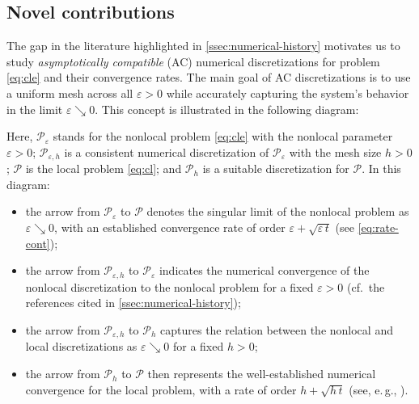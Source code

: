 \documentclass[10pt]{amsart}
\theoremstyle{plain}
\theoremstyle{definition}
\numberwithin{equation}{section}
\newcommand{\eps}{{\varepsilon}}
\begin{document}
\subsection{Novel contributions}
\label{ssec:novelty}

The gap in the literature highlighted in \cref{ssec:numerical-history} motivates us to study \emph{asymptotically compatible} (AC) numerical discretizations for problem \cref{eq:cle} and their convergence rates. The main goal of AC discretizations is to use a uniform mesh across all $\eps>0$ while accurately capturing the system's behavior in the limit $\eps \searrow 0$. This concept is illustrated in the following diagram:
\begin{center}
\end{center}
Here, $\mathcal{P}_{\eps}$ stands for the nonlocal problem \cref{eq:cle} with the nonlocal parameter $\eps >0$; $\mathcal{P}_{\eps,h}$ is a consistent numerical discretization of $\mathcal{P}_{\eps}$ with the mesh size $h>0$; $\mathcal P$ is the local problem \cref{eq:cl}; and $\mathcal P_h$ is a suitable discretization for $\mathcal P$. In this diagram:
\begin{itemize}
    \item the arrow from $\mathcal{P}_{\eps}$ to $\mathcal{P}$ denotes the singular limit of the nonlocal problem as $\eps \searrow 0$, with an established convergence rate of order $\eps + \sqrt{\eps\, t}$ (see \cref{eq:rate-cont});
    \item the arrow from $\mathcal{P}_{\eps,h}$ to $\mathcal{P}_\eps$ indicates the numerical convergence of the nonlocal discretization to the nonlocal problem for a fixed $\eps>0$ (cf.~the references cited in \cref{ssec:numerical-history});
    \item the arrow from $\mathcal{P}_{\eps,h}$ to $\mathcal{P}_h$ captures the relation between the nonlocal and local discretizations as $\eps \searrow 0$ for a fixed $h > 0$;
    \item the arrow from $\mathcal{P}_h$ to $\mathcal{P}$ then represents the well-established numerical convergence for the local problem, with a rate of order $h + \sqrt{h\, t}$ (see, e.\,g., \cite{MR3443431}).
\end{itemize}
\end{document}
